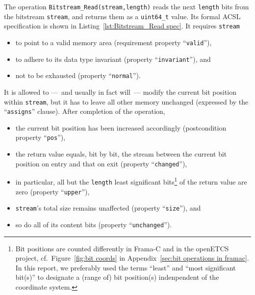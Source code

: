 The operation 
\lstinline{Bitstream_Read(stream,length)}
reads the next \lstinline{length} bits from the bitstream
\lstinline{stream}, and returns them as a \lstinline{uint64_t} value.
%
Its formal ACSL specification is shown in 
Listing~\ref{lst:Bitstream_Read spec}.
%
It requires \lstinline{stream}
%
\begin{itemize}
\item to point to a valid memory area 
	(requirement property ``\lstinline{valid}''),
\item to adhere to its data type invariant
	(property ``\lstinline{invariant}''), and
\item not to be exhausted (property ``\lstinline{normal}'').
\end{itemize}
%
It is allowed to ---~and usually in fact will~--- modify the current bit
position within \lstinline{stream}, but it has to leave all other memory
unchanged (expressed by the ``\lstinline{assigns}'' clause).
%
After completion of the operation, 
%
\begin{itemize}
\item the current bit position has been increased accordingly
	(postcondition property ``\lstinline{pos}''),
\item the return value equals, bit by bit, the stream between the
	current bit position on entry and that on exit
	(property ``\lstinline{changed}''),
\item in particular, all but the \lstinline{length} least significant
	bits\footnote{
		Bit positions are counted differently in Frama-C and in
		the openETCS project, cf.\
		Figure~\ref{fig:bit coords} 
		in Appendix~\ref{sec:bit operations in framac}.
		In this report, we preferably used the terms ``least''
		and ``most significant bit(s)'' to
		designate a (range of) bit position(s) indenpendent of
		the coordinate system.
	}
	of the return value are zero
	(property ``\lstinline{upper}''),
\item \lstinline{stream}'s total size remains unaffected
	(property ``\lstinline{size}''), and
\item so do all of its content bits
	(property ``\lstinline{unchanged}'').
\end{itemize}



